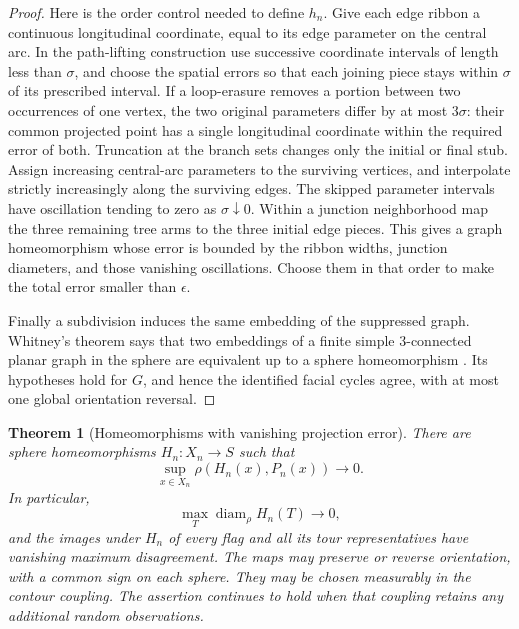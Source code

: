 \documentclass[11pt]{article}
\numberwithin{equation}{section}
\newtheorem{theorem}{Theorem}[section]
\theoremstyle{definition}
\theoremstyle{remark}
\newcommand{\1}{\mathbf 1}
\begin{document}
\begin{proof}
Here is the order control needed to define $h_n$.  Give each edge
ribbon a continuous longitudinal coordinate, equal to its edge
parameter on the central arc.  In the path-lifting construction use
successive coordinate intervals of length less than $\sigma$, and
choose the spatial errors so that each joining piece stays within
$\sigma$ of its prescribed interval.  If a loop-erasure removes a
portion between two occurrences of one vertex, the two original
parameters differ by at most $3\sigma$: their common projected
point has a single longitudinal coordinate within the required
error of both.  Truncation at the branch sets changes only the
initial or final stub.  Assign increasing central-arc parameters to
the surviving vertices, and interpolate strictly increasingly
along the surviving edges.  The skipped parameter intervals have
oscillation tending to zero as $\sigma\downarrow0$.
Within a junction neighborhood map the three remaining tree arms
to the three initial edge pieces.  This gives a graph homeomorphism
whose error is bounded by the ribbon widths, junction diameters,
and those vanishing oscillations.  Choose them in that order to
make the total error smaller than $\epsilon$.

Finally a subdivision induces the same embedding of the suppressed
graph.  Whitney's theorem says that two embeddings of a finite
simple $3$-connected planar graph in the sphere are equivalent up
to a sphere homeomorphism \cite{Whitney1932}.  Its hypotheses hold
for $G$, and hence the identified facial cycles agree, with at most
one global orientation reversal.
\end{proof}

\begin{theorem}[Homeomorphisms with vanishing projection error]
\label{top:homeomorphism}
There are sphere homeomorphisms $H_n:X_n\to S$ such that
\begin{equation}\label{top:homeomorphism-error}
 \sup_{x\in X_n}\rho(H_n(x),P_n(x))\longrightarrow0.
\end{equation}
In particular,
\begin{equation}\label{top:homeomorphism-mesh}
 \max_{T}\operatorname{diam}_\rho H_n(T)\longrightarrow0,
\end{equation}
and the images under $H_n$ of every flag and all its tour
representatives have vanishing maximum disagreement.  The maps may
preserve or reverse orientation, with a common sign on each sphere.
They may be chosen measurably in the contour coupling.  The assertion
continues to hold when that coupling retains any additional random
observations.
\end{theorem}
\end{document}
